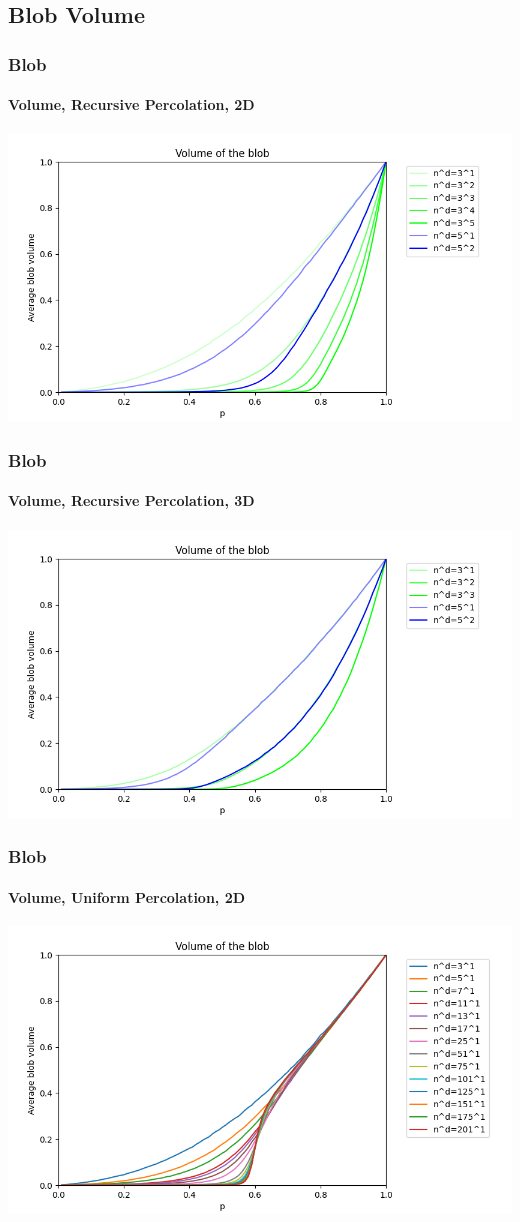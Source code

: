 \documentclass{beamer}
\begin{document}
	\subsection{Blob Volume}
	\begin{frame}
	    \frametitle{Blob}
	    \framesubtitle{Volume, Recursive Percolation, 2D}
	    \includegraphics[scale=0.5]{imgs/blob_vol_2D.png}
	\end{frame}
	\begin{frame}
		\frametitle{Blob}
		\framesubtitle{Volume, Recursive Percolation, 3D}
		\includegraphics[scale=0.5]{imgs/blob_vol_3D.png}
	\end{frame}
	\begin{frame}
		\frametitle{Blob}
		\framesubtitle{Volume, Uniform Percolation, 2D}
		\includegraphics[scale=0.5]{imgs/blob_vol_2D_ter.png}
	\end{frame}
\end{document}
